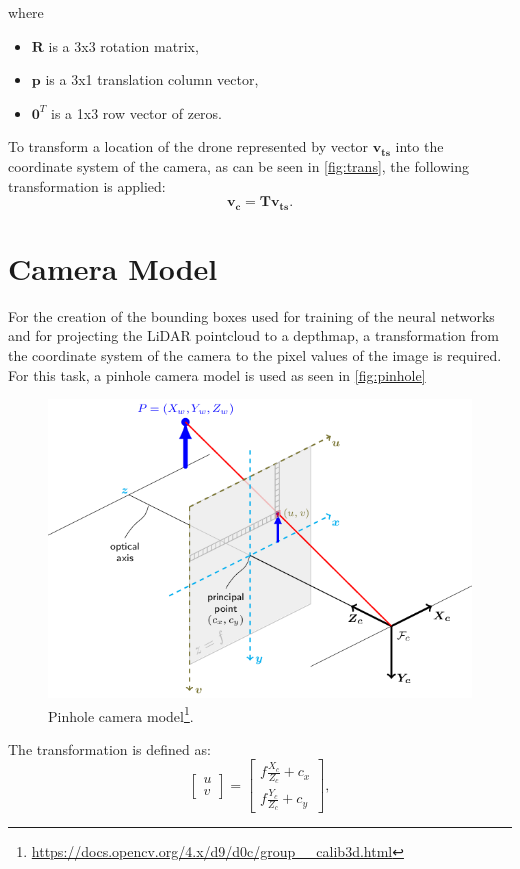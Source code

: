 \documentclass[twoside]{ctuthesis}
\theoremstyle{plain}
\theoremstyle{definition}
\theoremstyle{note}
\begin{document}
where
\begin{itemize}
	\item $\textbf{R}$ is a 3x3 rotation matrix,
	\item $\textbf{p}$ is a 3x1 translation column vector,
	\item $\textbf{0}^T$ is a 1x3 row vector of zeros.
\end{itemize}
To transform a location of the drone represented by vector $\mathbf{v_{ts}}$ into the coordinate system of the camera, as can be seen in \autoref{fig:trans}, the following transformation is applied:
\begin{equation}
	\mathbf{v_c}=\mathbf{T}\mathbf{v_{ts}}.
\end{equation}
\section{Camera Model} \label{sec:camera-model}
For the creation of the bounding boxes used for training of the neural networks and for projecting the LiDAR pointcloud to a depthmap, a transformation from the coordinate system of the camera to the pixel values of the image is required. For this task, a pinhole camera model is used as seen in \autoref{fig:pinhole}
\begin{figure}
	\centering
	\includegraphics[width=\textwidth]{pinhole_camera_model.png}
	\caption[Pinhole camera model.]{Pinhole camera model\footnote{\url{https://docs.opencv.org/4.x/d9/d0c/group__calib3d.html}}.}
	\label{fig:pinhole}
\end{figure}
The transformation is defined as:
\begin{equation} \label{eq:2}
	\begin{bmatrix}
		u\\
		v
	\end{bmatrix}=
	\begin{bmatrix}
		f\frac{X_c}{Z_c}+c_x\\
		f\frac{Y_c}{Z_c}+c_y
	\end{bmatrix},
\end{equation}
\end{document}
